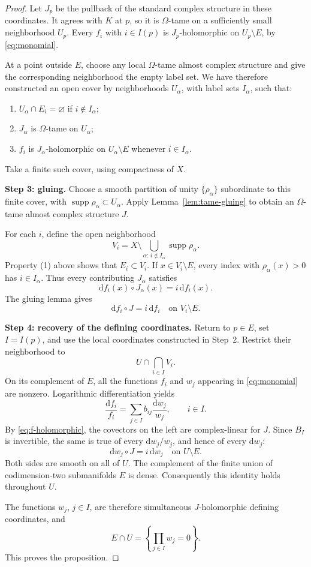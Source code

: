 \documentclass[11pt]{article}
\theoremstyle{definition}
\theoremstyle{remark}
\newcommand{\dd}{\mathrm d}
\newcommand{\supp}{\operatorname{supp}}
\begin{document}
\begin{proof}
Let $J_p$ be the pullback of the standard complex structure
in these coordinates.  It agrees with $K$ at $p$, so it is
$\Omega$-tame on a sufficiently small neighborhood $U_p$.
Every $f_i$ with $i\in I(p)$ is $J_p$-holomorphic on
$U_p\setminus E$, by \eqref{eq:monomial}.

At a point outside $E$, choose any local $\Omega$-tame almost
complex structure and give the corresponding neighborhood the
empty label set.  We have therefore constructed an open cover
by neighborhoods $U_\alpha$, with label sets $I_\alpha$, such
that:
\begin{enumerate}[label=\textup{(\arabic*)}]
\item $U_\alpha\cap E_i=\varnothing$ if $i\notin I_\alpha$;
\item $J_\alpha$ is $\Omega$-tame on $U_\alpha$;
\item $f_i$ is $J_\alpha$-holomorphic on $U_\alpha\setminus E$
      whenever $i\in I_\alpha$.
\end{enumerate}
Take a finite such cover, using compactness of $X$.

\medskip
\noindent\textbf{Step 3: gluing.}
Choose a smooth partition of unity $\{\rho_\alpha\}$
subordinate to this finite cover, with
$\supp\rho_\alpha\subset U_\alpha$.  Apply
Lemma~\ref{lem:tame-gluing} to obtain an $\Omega$-tame almost
complex structure $J$.

For each $i$, define the open neighborhood
\[
V_i
=
X\setminus
\bigcup_{\alpha:\,i\notin I_\alpha}\supp\rho_\alpha.
\]
Property (1) above shows that $E_i\subset V_i$.
If $x\in V_i\setminus E$, every index with
$\rho_\alpha(x)>0$ has $i\in I_\alpha$.  Thus every contributing
$J_\alpha$ satisfies
\[
\dd f_i(x)\circ J_\alpha(x)=i\,\dd f_i(x).
\]
The gluing lemma gives
\begin{equation}\label{eq:f-holomorphic}
\dd f_i\circ J=i\,\dd f_i
\quad\text{on }V_i\setminus E.
\end{equation}

\medskip
\noindent\textbf{Step 4: recovery of the defining coordinates.}
Return to $p\in E$, set $I=I(p)$, and use the local coordinates
constructed in Step~2.  Restrict their neighborhood to
\[
U\cap\bigcap_{i\in I}V_i.
\]
On its complement of $E$, all the functions $f_i$ and $w_j$
appearing in \eqref{eq:monomial} are nonzero.  Logarithmic
differentiation yields
\[
\frac{\dd f_i}{f_i}
=
\sum_{j\in I}b_{ij}\frac{\dd w_j}{w_j},
\qquad i\in I.
\]
By \eqref{eq:f-holomorphic}, the covectors on the left are
complex-linear for $J$.  Since $B_I$ is invertible, the same
is true of every $\dd w_j/w_j$, and hence of every $\dd w_j$:
\[
\dd w_j\circ J=i\,\dd w_j
\quad\text{on }U\setminus E.
\]
Both sides are smooth on all of $U$.  The complement of the
finite union of codimension-two submanifolds $E$ is dense.
Consequently this identity holds throughout $U$.

The functions $w_j$, $j\in I$, are therefore simultaneous
$J$-holomorphic defining coordinates, and
\[
E\cap U=\left\{\prod_{j\in I}w_j=0\right\}.
\]
This proves the proposition.
\end{proof}
\end{document}
